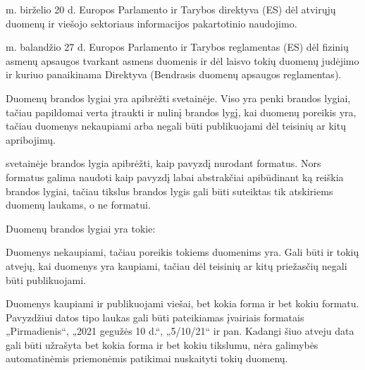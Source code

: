 \documentclass[letterpaper,10pt,lithuanian]{sphinxmanual}
\begin{document}
\begin{description}
 m. birželio 20 d. Europos Parlamento ir Tarybos direktyva (ES)
 dėl atvirųjų duomenų ir viešojo sektoriaus informacijos
pakartotinio naudojimo.

 m. balandžio 27 d. Europos Parlamento ir Tarybos reglamentas (ES)
 dėl fizinių asmenų apsaugos tvarkant asmens duomenis ir dėl
laisvo tokių duomenų judėjimo ir kuriuo panaikinama Direktyva
 (Bendrasis duomenų apsaugos reglamentas).

\sphinxAtStartPar
Duomenų brandos lygiai yra apibrėžti  svetainėje.
Viso yra penki brandos lygiai, tačiau papildomai verta įtraukti ir
nulinį brandos lygį, kai duomenų poreikis yra, tačiau duomenys
nekaupiami arba negali būti publikuojami dėl teisinių ar kitų
apribojimų.

\sphinxAtStartPar
{} svetainėje brandos lygia apibrėžti, kaip pavyzdį
nurodant formatus. Nors formatus galima naudoti kaip pavyzdį labai
abstrakčiai apibūdinant ką reiškia brandos lygiai, tačiau tikslus
brandos lygis gali būti suteiktas tik atskiriems duomenų  laukams, o
ne formatui.

\sphinxAtStartPar
Duomenų brandos lygiai yra tokie:
\begin{description}
\sphinxAtStartPar
Duomenys nekaupiami, tačiau poreikis tokiems duomenims yra. Gali
būti ir tokių atvejų, kai duomenys yra kaupiami, tačiau dėl teisinių
ar kitų priežasčių negali būti publikuojami.

\sphinxAtStartPar
Duomenys kaupiami ir publikuojami viešai, bet kokia forma ir bet
kokiu formatu. Pavyzdžiui datos tipo laukas gali būti pateikiamas
įvairiais formatais „Pirmadienis“, „2021 gegužės 10 d.“,
„5/10/21“ ir pan. Kadangi šiuo atveju data gali būti užrašyta bet
kokia forma ir bet kokiu tikslumu, nėra galimybės automatinėmis
priemonėmis patikimai nuskaityti tokių duomenų.


\end{description}
\end{description}
\end{document}
